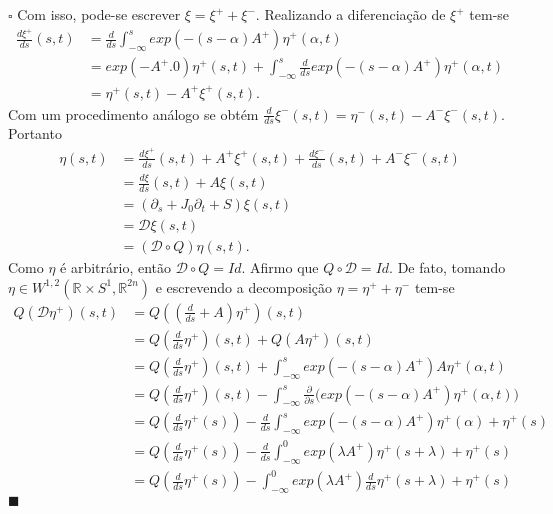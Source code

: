 \documentclass[12pt]{book}
\newenvironment{prova}[1]{$\square$ #1}{\hfill$\blacksquare$}
\newcommand{\circulo}{S^{1}}
\newcommand{\diferencialfloerabrev}{\mathcal{D}}
\newcommand{\derivada}[2]{\frac{d #1}{d #2}}
\newcommand{\derivadaparcial}[2]{\frac{\partial #1}{\partial #2}}
\newcommand{\derivadaparcialabrev}[1]{\partial_{#1}}
\newcommand{\espacosobolevdois}[2]{\espacosobolevgeral{2}{#1, #2}}
\newcommand{\espacosobolevgeral}[2]{W^{1,#1}(#2)}
\newcommand{\estruturacomplexa}{J_{0}}
\newcommand{\retacartesianocirculo}{\real{} \times \circulo}
\newcommand{\real}[1]{\mathbb{R}^{#1}}
\begin{document}
\begin{prova}
		Com isso, pode-se escrever $\xi = \xi^{+} + \xi^{-}$. Realizando a diferenciação de $\xi^{+}$ tem-se
		$$
		\begin{aligned}
		\derivada{\xi^{+}}{s}(s,t) 
		&= \derivada{}{s}\int_{-\infty}^{s}exp(-(s-\alpha)A^{+})\eta^{+}(\alpha,t)
		\\
		&= exp(-A^{+}.0)\eta^{+}(s,t)+\int_{-\infty}^{s} \derivada{}{s} exp(-(s-\alpha)A^{+})\eta^{+}(\alpha,t) 
		\\
		&= \eta^{+}(s,t)-A^{+}\xi^{+}(s,t).
		\end{aligned}
		$$
		Com um procedimento análogo se obtém $\derivada{}{s}\xi^{-} (s,t)= \eta^{-}(s,t)-A^{-}\xi^{-}(s,t)$. Portanto 
		$$
		\begin{aligned}
			\eta(s,t) 
			&= \derivada{\xi^{+}}{s}(s,t)+A^{+}\xi^{+}(s,t)+\derivada{\xi^{-}}{s}(s,t)+A^{-}\xi^{-}(s,t)
			\\ 
			&=\derivada{\xi}{s}(s,t)+A\xi(s,t)
			\\
			&= (\derivadaparcialabrev{s}+\estruturacomplexa \derivadaparcialabrev{t} + S)\xi(s,t)
			\\
			&= \diferencialfloerabrev \xi(s,t) 
			\\
			&= (\diferencialfloerabrev \circ Q)\eta(s,t).
		\end{aligned}
		$$
		Como $\eta$ é arbitrário, então $\diferencialfloerabrev \circ Q=Id$. Afirmo que $Q\circ \diferencialfloerabrev = Id$. De fato, tomando $\eta \in \espacosobolevdois{\retacartesianocirculo}{\real{2n}}$ e escrevendo a decomposição $\eta=\eta^{+}+\eta^{-}$ tem-se
		$$
		\begin{aligned}
		Q(\diferencialfloerabrev \eta^{+})(s,t)
		&=Q((\derivada{}{s}+A)\eta^{+})(s,t)
		\\
		&=Q(\derivada{}{s}\eta^{+})(s,t) +Q(A\eta^{+})(s,t)
		\\
		&=Q(\derivada{}{s}\eta^{+})(s,t)  + \int_{-\infty}^{s}exp(-(s-\alpha)A^{+})A\eta^{+}(\alpha,t)
		\\
		&=Q(\derivada{}{s}\eta^{+})(s,t) - \int_{-\infty}^{s}\derivadaparcial{}{s}\Big(exp(-(s-\alpha)A^{+})\eta^{+}(\alpha,t)\Big)
		\\
		&=Q(\derivada{}{s}\eta^{+}(s)) - \derivada{}{s}\int_{-\infty}^{s} exp(-(s-\alpha)A^{+})\eta^{+}(\alpha) + \eta^{+}(s)
		\\
		&=Q(\derivada{}{s}\eta^{+}(s)) - \derivada{}{s}\int_{-\infty}^{0} exp(\lambda A^{+})\eta^{+}(s+\lambda) + \eta^{+}(s)
		\\
		&=Q(\derivada{}{s}\eta^{+}(s)) - \int_{-\infty}^{0} exp(\lambda A^{+})\derivada{}{s}\eta^{+}(s+\lambda) + \eta^{+}(s)

\end{aligned}$$
\end{prova}
\end{document}
